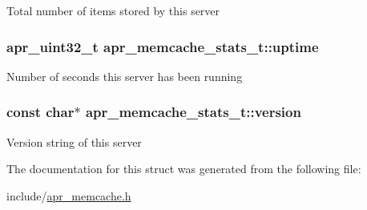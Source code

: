 Total number of items stored by this server \hypertarget{structapr__memcache__stats__t_aec6db8440a51aabfbfaf2130ec5a78bb}{
\subsubsection[{uptime}]{\setlength{\rightskip}{0pt plus 5cm}apr\-\_\-uint32\-\_\-t apr\-\_\-memcache\-\_\-stats\-\_\-t\-::uptime}}\label{structapr__memcache__stats__t_aec6db8440a51aabfbfaf2130ec5a78bb}
Number of seconds this server has been running \hypertarget{structapr__memcache__stats__t_a5fa17a72064c6b5ae0624f5945fceea7}{
\subsubsection[{version}]{\setlength{\rightskip}{0pt plus 5cm}const char$\ast$ apr\-\_\-memcache\-\_\-stats\-\_\-t\-::version}}\label{structapr__memcache__stats__t_a5fa17a72064c6b5ae0624f5945fceea7}
Version string of this server 

The documentation for this struct was generated from the following file\-:\begin{DoxyCompactItemize}
\item 
include/\hyperlink{apr__memcache_8h}{apr\-\_\-memcache.\-h}\end{DoxyCompactItemize}
